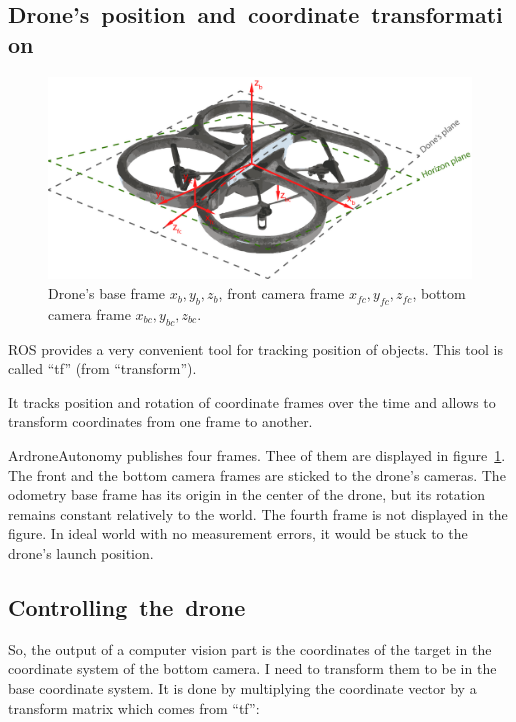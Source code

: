 \documentclass[12pt]{article}
\begin{document}
    \subsection{Drone's~position~and~coordinate~transformation}

    \begin{figure}[htbp]
        \noindent\centering
            \includegraphics{frames.png}
        \caption{Drone's base frame $x_b, y_b, z_b$, front camera frame $x_{fc}, y_{fc}, z_{fc}$, bottom camera frame $x_{bc}, y_{bc}, z_{bc}$.}
        \label{fig:frames}
    \end{figure}

    ROS provides a very convenient tool for tracking position of
    objects. This tool is called ``tf'' (from ``transform'').

    It tracks position and rotation of coordinate frames over the time and allows
    to transform coordinates from one frame to another.

    ArdroneAutonomy publishes four frames.
    Thee of them are displayed in figure~\ref{fig:frames}.
    The front and the bottom camera frames are sticked to the drone's cameras.
    The odometry base frame has its origin in the center of the drone, but its
    rotation remains constant relatively to the world.
    The fourth frame is not displayed in the figure. In ideal world with
    no measurement errors, it would be stuck to the drone's
    launch position.

    \subsection{Controlling~the~drone}

    So, the output of a computer vision part is the coordinates of the target
    in the coordinate system of the bottom camera. I need to transform them
    to be in the base coordinate system. It is done by multiplying
    the coordinate vector by a transform matrix which comes from ``tf'':
\end{document}
